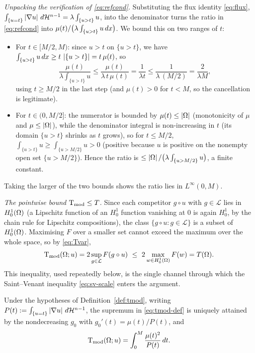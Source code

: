 \emph{Unpacking the verification of \eqref{eq:refcond}.} Substituting the
flux identity \eqref{eq:flux}, $\int_{\{u=t\}}\left|\nabla u\right|\,d\mathcal H^{n-1}
=\lambda\int_{\{u>t\}}u$, into the denominator turns the ratio in
\eqref{eq:refcond} into $\mu(t)/\bigl(\lambda\int_{\{u>t\}}u\,dx\bigr)$. We
bound this on two ranges of $t$:
\begin{itemize}
\item For $t\in[M/2,M)$: since $u>t$ on $\{u>t\}$, we have
$\int_{\{u>t\}}u\,dx\ge t\,\left|\{u>t\}\right|=t\,\mu(t)$, so
\[
  \frac{\mu(t)}{\lambda\int_{\{u>t\}}u}
  \le\frac{\mu(t)}{\lambda\, t\,\mu(t)}=\frac{1}{\lambda t}
  \le\frac{1}{\lambda\,(M/2)}=\frac{2}{\lambda M},
\]
using $t\ge M/2$ in the last step (and $\mu(t)>0$ for $t<M$, so the
cancellation is legitimate).
\item For $t\in(0,M/2]$: the numerator is bounded by $\mu(t)\le\left|\Omega\right|$
(monotonicity of $\mu$ and $\mu\le\left|\Omega\right|$), while the denominator integral
is non-increasing in $t$ (its domain $\{u>t\}$ shrinks as $t$ grows), so for
$t\le M/2$, $\int_{\{u>t\}}u\ge\int_{\{u>M/2\}}u>0$ (positive because $u$ is
positive on the nonempty open set $\{u>M/2\}$). Hence the ratio is
$\le\left|\Omega\right|/\bigl(\lambda\int_{\{u>M/2\}}u\bigr)$, a finite constant.
\end{itemize}
Taking the larger of the two bounds shows the ratio lies in $L^\infty(0,M)$.

\emph{The pointwise bound $\operatorname{T_{\mathrm{mod}}}\le T$.} Since each competitor $g\circ u$
with $g\in\mathcal L$ lies in $H^1_0(\Omega)$ (a Lipschitz function of an
$H^1_0$ function vanishing at $0$ is again $H^1_0$, by the chain rule for
Lipschitz compositions), the class $\{g\circ u:g\in\mathcal L\}$ is a subset
of $H^1_0(\Omega)$. Maximising $F$ over a smaller set cannot exceed the maximum
over the whole space, so by \eqref{eq:Tvar},
\begin{equation}\label{eq:tmod-le-t}
  \operatorname{T_{\mathrm{mod}}}(\Omega;u)=2\sup_{g\in\mathcal L}F(g\circ u)
  \ \le\ 2\max_{w\in H^1_0(\Omega)}F(w)=T(\Omega).
\end{equation}
This inequality, used repeatedly below, is the single channel through which
the Saint--Venant inequality \eqref{eq:sv-scale} enters the argument.

\begin{lemma}\label{lem:tmod-formula}
Under the hypotheses of Definition~\ref{def:tmod}, writing
$P(t):=\int_{\{u=t\}}\left|\nabla u\right|\,d\mathcal H^{n-1}$, the supremum in
\eqref{eq:tmod-def} is uniquely attained by the nondecreasing $g_0$ with
$g_0'(t)=\mu(t)/P(t)$, and
\begin{equation}\label{eq:tmod-formula}
  \operatorname{T_{\mathrm{mod}}}(\Omega;u)=\int_0^M\frac{\mu(t)^2}{P(t)}\,dt .
\end{equation}
\end{lemma}


